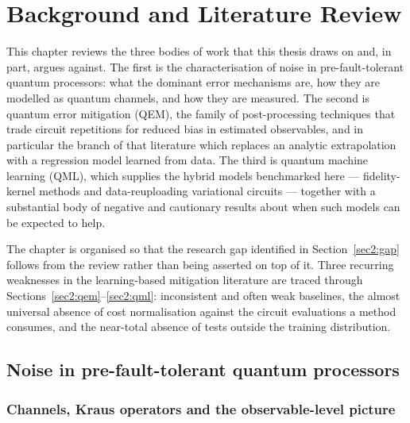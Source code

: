 \documentclass[Thesis.tex]{subfiles}
\begin{document}
\setcounter{chapter}{1} %
\chapter{Background and Literature Review}\label{chap2:background}

This chapter reviews the three bodies of work that this thesis draws on and,
in part, argues against. The first is the characterisation of noise in
pre-fault-tolerant quantum processors: what the dominant error mechanisms are,
how they are modelled as quantum channels, and how they are measured. The
second is quantum error mitigation (QEM), the family of post-processing
techniques that trade circuit repetitions for reduced bias in estimated
observables, and in particular the branch of that literature which replaces an
analytic extrapolation with a regression model learned from data. The third is
quantum machine learning (QML), which supplies the hybrid models benchmarked
here --- fidelity-kernel methods and data-reuploading variational circuits ---
together with a substantial body of negative and cautionary results about when
such models can be expected to help.

The chapter is organised so that the research gap identified in
Section~\ref{sec2:gap} follows from the review rather than being asserted on
top of it. Three recurring weaknesses in the learning-based mitigation
literature are traced through Sections~\ref{sec2:qem}--\ref{sec2:qml}:
inconsistent and often weak baselines, the almost universal absence of
cost normalisation against the circuit evaluations a method consumes, and the
near-total absence of tests outside the training distribution.

\section{Noise in pre-fault-tolerant quantum processors}\label{sec2:noise}

\subsection{Channels, Kraus operators and the observable-level picture}
\end{document}
